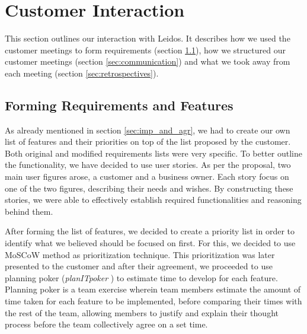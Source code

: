 \documentclass{l3proj}
\begin{document}
\section{Customer Interaction}
\label{sec:customer}
    This section outlines our interaction with Leidos. It describes how we used the customer meetings to form requirements (section \ref{sec:req_and_feat}), how we structured our customer meetings (section \ref{sec:communication}) and what we took away from each meeting (section \ref{sec:retrospectives}).
    
    \subsection{Forming Requirements and Features}
    \label{sec:req_and_feat}
        As already mentioned in section \ref{sec:imp_and_agr}, we had to create our own list of features and their priorities on top of the list proposed by the customer. Both original and modified requirements lists were very specific. To better outline the functionality, we have decided to use user stories. As per the proposal, two main user figures arose, a customer and a business owner. Each story focus on one of the two figures, describing their needs and wishes. By constructing these stories, we were able to effectively establish required functionalities and reasoning behind them.
        

        

        After forming the list of features, we decided to create a priority list in order to identify what we believed should be focused on first. For this, we decided to use MoSCoW \cite{moscow} method as prioritization technique. This prioritization was later presented to the customer and after their agreement, we proceeded to use planning poker (\textit{planITpoker} \cite{poker}) to estimate time to develop for each feature. Planning poker is a team exercise wherein team members estimate the amount of time taken for each feature to be implemented, before comparing their times with the rest of the team, allowing members to justify and explain their thought process before the team collectively agree on a set time.
        

        
\end{document}
